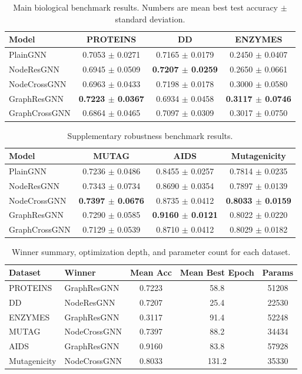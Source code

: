 \begin{table}[t]
\centering
\small
\caption{Main biological benchmark results. Numbers are mean best test accuracy $\pm$ standard deviation.}
\begin{tabular}{lccc}
\toprule
Model & PROTEINS & DD & ENZYMES \\
\midrule
PlainGNN & 0.7053 $\pm$ 0.0271 & 0.7165 $\pm$ 0.0179 & 0.2450 $\pm$ 0.0407 \\
NodeResGNN & 0.6945 $\pm$ 0.0509 & \textbf{0.7207 $\pm$ 0.0259} & 0.2650 $\pm$ 0.0661 \\
NodeCrossGNN & 0.6963 $\pm$ 0.0433 & 0.7198 $\pm$ 0.0178 & 0.3000 $\pm$ 0.0580 \\
GraphResGNN & \textbf{0.7223 $\pm$ 0.0367} & 0.6934 $\pm$ 0.0458 & \textbf{0.3117 $\pm$ 0.0746} \\
GraphCrossGNN & 0.6864 $\pm$ 0.0465 & 0.7097 $\pm$ 0.0309 & 0.3017 $\pm$ 0.0750 \\
\bottomrule
\end{tabular}
\end{table}

\begin{table}[t]
\centering
\small
\caption{Supplementary robustness benchmark results.}
\begin{tabular}{lccc}
\toprule
Model & MUTAG & AIDS & Mutagenicity \\
\midrule
PlainGNN & 0.7236 $\pm$ 0.0486 & 0.8455 $\pm$ 0.0257 & 0.7814 $\pm$ 0.0235 \\
NodeResGNN & 0.7343 $\pm$ 0.0734 & 0.8690 $\pm$ 0.0354 & 0.7897 $\pm$ 0.0139 \\
NodeCrossGNN & \textbf{0.7397 $\pm$ 0.0676} & 0.8735 $\pm$ 0.0412 & \textbf{0.8033 $\pm$ 0.0159} \\
GraphResGNN & 0.7290 $\pm$ 0.0585 & \textbf{0.9160 $\pm$ 0.0121} & 0.8022 $\pm$ 0.0220 \\
GraphCrossGNN & 0.7129 $\pm$ 0.0539 & 0.8710 $\pm$ 0.0412 & 0.8029 $\pm$ 0.0182 \\
\bottomrule
\end{tabular}
\end{table}

\begin{table}[t]
\centering
\small
\caption{Winner summary, optimization depth, and parameter count for each dataset.}
\begin{tabular}{l l c c c}
\toprule
Dataset & Winner & Mean Acc & Mean Best Epoch & Params \\
\midrule
PROTEINS & GraphResGNN & 0.7223 & 58.8 & 51208 \\
DD & NodeResGNN & 0.7207 & 25.4 & 22530 \\
ENZYMES & GraphResGNN & 0.3117 & 91.4 & 52248 \\
MUTAG & NodeCrossGNN & 0.7397 & 88.2 & 34434 \\
AIDS & GraphResGNN & 0.9160 & 83.8 & 57928 \\
Mutagenicity & NodeCrossGNN & 0.8033 & 131.2 & 35330 \\
\bottomrule
\end{tabular}
\end{table}
